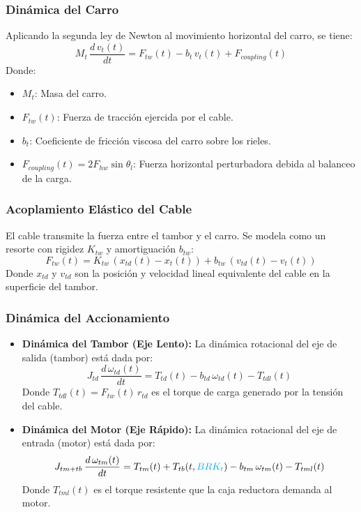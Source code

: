 \documentclass[11pt]{article}                                    %
\begin{document}
\subsubsection{Dinámica del Carro}
Aplicando la segunda ley de Newton al movimiento horizontal del carro, se tiene:
\begin{equation} \label{eq:carro_newton}
    M_t \, \frac{d \, v_t(t)}{dt} = F_{tw}(t) - b_t \, v_t(t) + F_{coupling}(t)
\end{equation}
Donde:
\begin{itemize}
    \item $M_t$: Masa del carro.
    \item $F_{tw}(t)$: Fuerza de tracción ejercida por el cable.
    \item $b_t$: Coeficiente de fricción viscosa del carro sobre los rieles.
    \item $F_{coupling}(t) = 2 F_{hw} \sin\theta_l$: Fuerza horizontal perturbadora debida al balanceo de la carga.
\end{itemize}

\subsubsection{Acoplamiento Elástico del Cable}
El cable transmite la fuerza entre el tambor y el carro. Se modela como un resorte con rigidez $K_{tw}$ y amortiguación $b_{tw}$:
\begin{equation} \label{eq:fuerza_cable}
    F_{tw}(t) = K_{tw} \, (x_{td}(t) - x_t(t)) + b_{tw} \, (v_{td}(t) - v_t(t))
\end{equation}
Donde $x_{td}$ y $v_{td}$ son la posición y velocidad lineal equivalente del cable en la superficie del tambor.

\subsubsection{Dinámica del Accionamiento}
\begin{itemize}
    \item \textbf{Dinámica del Tambor (Eje Lento):} La dinámica rotacional del eje de salida (tambor) está dada por:
    \begin{equation} \label{eq:eje_lento}
        J_{td} \, \frac{d \, \omega_{td}(t)}{dt} = T_{td}(t) - b_{td} \, \omega_{td}(t) - T_{tdl}(t)
    \end{equation}
    Donde $T_{tdl}(t) = F_{tw}(t) \, r_{td}$ es el torque de carga generado por la tensión del cable.

    \item \textbf{Dinámica del Motor (Eje Rápido):} La dinámica rotacional del eje de entrada (motor) está dada por:
    \begin{equation} \label{eq:eje_rapido}
        J_{tm+tb} \, \frac{d \, \omega_{tm}(t)}{dt} = T_{tm}(t) + T_{tb}(t,\textcolor{cyan}{BRK_t}) - b_{tm} \, \omega_{tm}(t) - T_{tml}(t)
    \end{equation}
    Donde $T_{tml}(t)$ es el torque resistente que la caja reductora demanda al motor.
\end{itemize}
\end{document}
